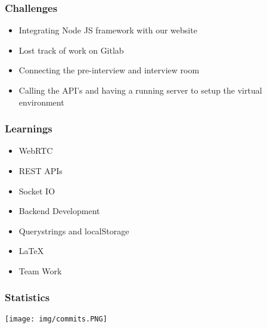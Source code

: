 \documentclass[14pt]{beamer}
\begin{document}
{
\begin{frame}
    \frametitle{Challenges}
    \begin{itemize}
\item[\textcolor{deepblue}{\textbullet}] Integrating Node JS framework with our website
\item[\textcolor{deepblue}{\textbullet}] Lost track of work on Gitlab
\item[\textcolor{deepblue}{\textbullet}] Connecting the pre-interview and interview room
\item[\textcolor{deepblue}{\textbullet}] Calling the API's and having a running server to setup the virtual environment
    \end{itemize}
\end{frame}
}

{
\begin{frame}
    \frametitle{\textcolor{whitegray}{Learnings}}
    \begin{itemize}
\item[\textcolor{whitegray}{\textbullet}] \textcolor{whitegray}{WebRTC}
\item[\textcolor{whitegray}{\textbullet}] \textcolor{whitegray}{REST APIs}
\item[\textcolor{whitegray}{\textbullet}] \textcolor{whitegray}{Socket IO}
\item[\textcolor{whitegray}{\textbullet}] \textcolor{whitegray}{Backend Development}
\item[\textcolor{whitegray}{\textbullet}] \textcolor{whitegray}{Querystrings and localStorage}
\item[\textcolor{whitegray}{\textbullet}] \textcolor{whitegray}{\LaTeX}
\item[\textcolor{whitegray}{\textbullet}] \textcolor{whitegray}{Team Work}
    \end{itemize}
\end{frame}
}

{
\begin{frame}
    \frametitle{\textcolor{deepblue}{Statistics}}
        \texttt{[image: img/commits.PNG]}
\end{frame}
}
\end{document}
